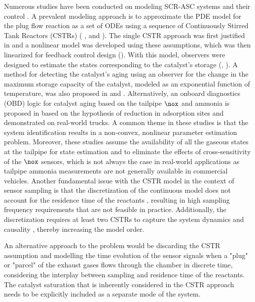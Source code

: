 Numerous studies have been conducted on modeling SCR-ASC systems and their control \cite{yuan2015diesel}. A prevalent
modeling approach is to approximate the PDE model for the plug flow reaction as a set of ODEs using a sequence of
Continuously Stirred Tank Reactors (CSTRs) (\cite{hsieh2011development} , and \cite{nova2014urea}). The
single CSTR approach was first justified in \cite{devarakonda2008adequacy} and a nonlinear model was developed using
these assumptions, which was then linearized for feedback control design (\cite{devarakonda2009model}). With this model,
observers were designed to estimate the states corresponding to the catalyst's storage (\cite{ma2017observer},
\cite{jain2020term}). A method for detecting the catalyst's aging using an observer for the change in the maximum
storage capacity of the catalyst, modeled as an exponential function of temperature, was also proposed in
\cite{ma2017observer} and \cite{jiang2019hydrothermal}. Alternatively, an onboard diagnostics (OBD) logic for catalyst
aging based on the tailpipe $\nox$ and ammonia is proposed in \cite{matsumoto2016model} based on the hypothesis of
reduction in adsorption sites and demonstrated on real-world trucks. A common theme in these studies is that the system
identification results in a non-convex, nonlinear parameter estimation problem. Moreover, these studies assume the
availability of all the gaseous states at the tailpipe for state estimation and to eliminate the effects of
cross-sensitivity of the $\nox$ sensors, which is not always the case in real-world applications as tailpipe ammonia
measurements are not generally available in commercial vehicles. Another fundamental issue with the CSTR model in the
context of sensor sampling is that the discretization of the continuous model does not account for the residence time
of the reactants \cite{charla2026board}, resulting in high sampling frequency requirements that are not feasible in
practice. Additionally, the discretization requires at least two CSTRs to capture the system dynamics and causality
\cite{charla2024reduced}, thereby increasing the model order.

An alternative approach to the problem would be discarding the CSTR assumption and modelling the time evolution of the
sensor signals when a "plug" or "parcel" of the exhaust gases flows through the chamber in discrete time, considering
the interplay between sampling and residence time of the reactants. The catalyst saturation that is inherently
considered in the CSTR approach needs to be explicitly included as a separate mode of the system.

